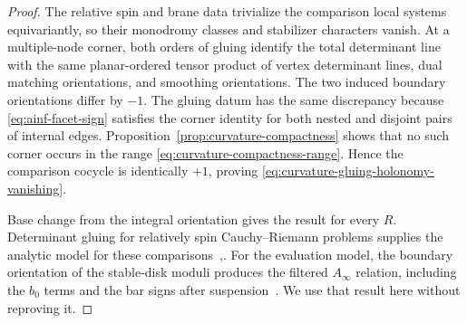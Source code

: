 \documentclass[11pt,letterpaper,twoside]{article}
\theoremstyle{plain}
\theoremstyle{definition}
\theoremstyle{remark}
\let\cite\citep
\newcommand{\Ainf}{A_\infty}
\begin{document}
\begin{proof}
The relative spin and brane data trivialize the comparison local systems equivariantly, so their monodromy classes and stabilizer characters vanish.  At a multiple-node corner, both orders of gluing identify the total determinant line with the same planar-ordered tensor product of vertex determinant lines, dual matching orientations, and smoothing orientations.  The two induced boundary orientations differ by $-1$.  The gluing datum has the same discrepancy because \eqref{eq:ainf-facet-sign} satisfies the corner identity for both nested and disjoint pairs of internal edges.  Proposition~\ref{prop:curvature-compactness} shows that no such corner occurs in the range \eqref{eq:curvature-compactness-range}.  Hence the comparison cocycle is identically $+1$, proving \eqref{eq:curvature-gluing-holonomy-vanishing}.

Base change from the integral orientation gives the result for every $R$.  Determinant gluing for relatively spin Cauchy--Riemann problems supplies the analytic model for these comparisons~\cite[Ch.~8]{fooo2009},\cite{wehrheimwoodward2017orientations}.  For the evaluation model, the boundary orientation of the stable-disk moduli produces the filtered \(\Ainf\) relation, including the \(b_0\) terms and the bar signs after suspension~\cite[Prop.~8.5.1]{fooo2009}.  We use that result here without reproving it.
\end{proof}
\end{document}
